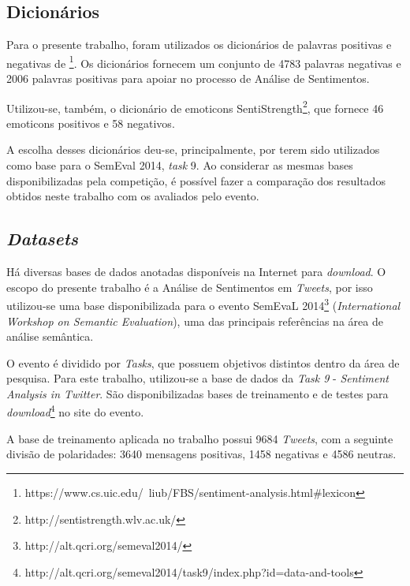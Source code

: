 \documentclass[12pt]{article}
\begin{document}
\subsection{Dicionários}

Para o presente trabalho, foram utilizados os dicionários de palavras positivas e negativas de \cite{HuAndLiu2004}\footnote{https://www.cs.uic.edu/~liub/FBS/sentiment-analysis.html\#lexicon}. Os dicionários fornecem um conjunto de 4783 palavras negativas e 2006 palavras positivas para apoiar no processo de Análise de Sentimentos.

Utilizou-se, também, o dicionário de emoticons SentiStrength\footnote{http://sentistrength.wlv.ac.uk/}, que fornece 46 emoticons positivos e 58 negativos.

A escolha desses dicionários deu-se, principalmente, por terem sido utilizados como base para o SemEval 2014, \emph{task} 9. Ao considerar as mesmas bases disponibilizadas pela competição, é possível fazer a comparação dos resultados obtidos neste trabalho com os avaliados pelo evento.

\subsection{\emph{Datasets}}
\label{datasets}
Há diversas bases de dados anotadas disponíveis na Internet para \emph{download}. O escopo do presente trabalho é a Análise de Sentimentos em \emph{Tweets}, por isso utilizou-se uma base disponibilizada para o evento SemEvaL 2014\footnote{http://alt.qcri.org/semeval2014/} (\emph{International Workshop on Semantic Evaluation}), uma das principais referências na área de análise semântica.  

O evento é dividido por \emph{Tasks}, que possuem objetivos distintos dentro da área de pesquisa. Para este trabalho, utilizou-se a base de dados da \emph{Task 9} - \emph{Sentiment Analysis in Twitter}. São disponibilizadas bases de treinamento e de testes para \emph{download}\footnote{http://alt.qcri.org/semeval2014/task9/index.php?id=data-and-tools} no site do evento.

A base de treinamento aplicada no trabalho possui 9684 \emph{Tweets}, com a seguinte divisão de polaridades: 3640 mensagens positivas, 1458 negativas e 4586 neutras.
\end{document}
